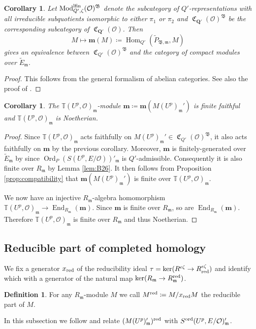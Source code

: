 \documentclass[leqno]{amsart}
\newtheorem{cor}[thm]{Corollary}
\theoremstyle{definition}
\newtheorem{defn}[thm]{Definition}
\theoremstyle{remark}
\newcommand{\oo}{\mathcal{O}}
\newcommand{\Q}{{\mathbf{Q}}}
\DeclareMathOperator{\End}{End}
\DeclareMathOperator{\Hom}{Hom}
\newcommand{\fm}{\mathfrak{m}}
\DeclareMathOperator{\Mod}{\textnormal{Mod}}
\DeclareMathOperator{\fC}{\mathfrak{C}} %
\DeclareMathOperator{\Ord}{Ord} %
\newcommand{\B}{\mathfrak B} %
\newcommand{\lfin}{\textnormal{lfin}}
\newcommand{\red}{\textnormal{red}}
\newcommand{\xx}{x_\textnormal{red}}
\newcommand{\TT}{\mathbb{T}} %
\newcommand{\ord}{\textnormal{ord}} %
\begin{document}
\begin{cor}
Let $\Mod^{\lfin}_{Q',\zeta}(\oo)^{\B}$
denote the subcategory of $Q'$-representations
with all irreducible subquotients isomorphic 
to either $\pi_1$ or $\pi_2$
and $\fC_{\Q'}(\oo)^\B$ be the corresponding 
subcategory of $\fC_{\Q'}(\oo)$. Then
\begin{equation}\label{eq:anti_equiv}
        M  \mapsto 
        \mathbf{m}(M)\coloneqq 
        \Hom_{Q'}(\tilde{P}_{\B,\fm}, M)
\end{equation}
gives an equivalence between $\fC_{Q'}(\oo)^\B$
and the category of compact modules over 
$\tilde{E}_{\fm}$.
\end{cor}
\begin{proof}
This follows from the general formalism of abelian categories.
See also the proof of \cite[Prop.5.45]{pask}.
\end{proof}


\begin{cor}\label{cor:Hecke_Noetherian}
    The $\TT(U^p,\oo)_{\fm}$-module
	$\mathbf{m}\coloneqq \mathbf{m}(M(U^p)_{\fm}')$
	is finite faithful and $\TT(U^p,\oo)_{\fm}$
    is Noetherian.
\end{cor}
\begin{proof}
    Since $\TT(U^p,\oo)_\fm$ acts faithfully on 
    $M(U^p)_\fm'\in \fC_{Q'}(\oo)^\B$,
    it also acts faithfully on 
	$\mathbf{m}$
    by the previous corollary.
    Moreover, $\mathbf{m}$
    is finitely-generated  over $\tilde{E}_{\fm}$ 
    by \cite[Prop 4.17]{pask} since 
    $\Ord_P(S(U^p,E/\oo))'_{\fm}$ is $Q'$-admissible.
    Consequently it is also finite over  $R_{\fm}$
    by Lemma \ref{lem:B26}.
    It then follows from Proposition
    \ref{prop:compatibility}
    that  $\mathbf{m}(M(U^p)_{\fm}')$ is finite over 
    $\TT(U^p,\oo)_\fm$.

    We now have an injective $R_\fm$-algebra homomorphism 
	$\TT(U^p,\oo)_{\fm}\to\End_{R_{\fm}}(\mathbf{m})$.
    Since $\mathbf{m}$ is finite over $R_\fm$,
    so are $\End_{R_\fm}(\mathbf{m})$.
    Therefore $\TT(U^p,\oo)_\fm$
	is finite over $R_{\fm}$ and thus Noetherian.
\end{proof}


\subsection{Reducible part of completed homology}

We fix a generator $\xx$ of the reducibility ideal
$\tau=\ker(R^{\epsilon\zeta}\to R^{\epsilon\zeta}_{\red})$
and identify which with a generator of the natural map
$\ker(R_\fm\to R_\fm^{\red})$.
\begin{defn}
For any $R_{\fm}$-module $M$
we call $M^{\red}\coloneqq M/\xx M$
the reducible part of $M$.
\end{defn}
In this subsection we follow \cite{urban}
and relate $(M(U^p)_\fm')^{\red}$
with $S^{\ord}(U^p,E/\oo)_\fm'$.
\end{document}
